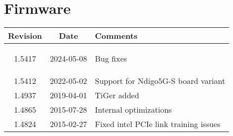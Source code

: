 \section{Firmware}
\begin{tabularx}{\textwidth}{|c|c|X|}
    \hline
    Revision & Date & Comments\\
    \hline\hline
    \hypertarget{fwrev}{1.5417} & 2024-05-08 & Bug fixes\\
    \hline
    1.5412 & 2022-05-02 & Support for Ndigo5G-S board variant\\
    \hline
    1.4937 & 2019-04-01 & TiGer added\\
    \hline
    1.4865 & 2015-07-28 & Internal optimizations\\
    \hline
    1.4824 & 2015-02-27 & Fixed intel PCIe link training issues\\
    \hline
\end{tabularx}